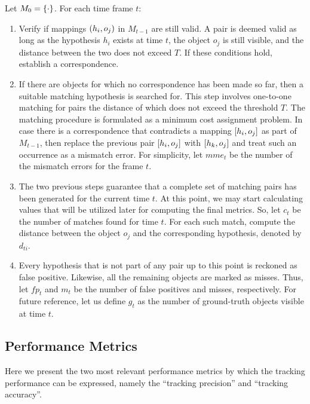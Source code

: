 Let $M_0 = \left\{ {\cdot} \right\}$. For each time frame $t$:
\begin{enumerate}
    \item Verify if mappings $\left( {h_i, o_j} \right)$ in $M_{t - 1}$ are still valid. A pair is deemed valid as long as the hypothesis $h_i$ exists at time $t$, the object $o_j$ is still visible, and the distance between the two does not exceed $T$. If these conditions hold, establish a correspondence.
    \item If there are objects for which no correspondence has been made so far, then a suitable matching hypothesis is searched for. This step involves one-to-one matching for pairs the distance of which does not exceed the threshold $T$. The matching procedure is formulated as a minimum cost assignment problem. In case there is a correspondence that contradicts a mapping $\left[ {h_i, o_j} \right]$ as part of $M_{t - 1}$, then replace the previous pair $\left[ {h_i, o_j} \right]$ with $\left[ {h_k, o_j} \right]$ and treat such an occurrence as a mismatch error. For simplicity, let $mme_t$ be the number of the mismatch errors for the frame $t$.
    \item The two previous steps guarantee that a complete set of matching pairs has been generated for the current time $t$. At this point, we may start calculating values that will be utilized later for computing the final metrics. So, let $c_t$ be the number of matches found for time $t$. For each such match, compute the distance between the object $o_j$ and the corresponding hypothesis, denoted by $d_{ti}$.
    \item Every hypothesis that is not part of any pair up to this point is reckoned as false positive. Likewise, all the remaining objects are marked as misses. Thus, let $fp_t$ and $m_t$ be the number of false positives and misses, respectively. For future reference, let us define $g_t$ as the number of ground-truth objects visible at time $t$.
\end{enumerate}

\subsection{Performance Metrics}

Here we present the two most relevant performance metrics by which the tracking performance can be expressed, namely the ``tracking precision'' and ``tracking accuracy''.

